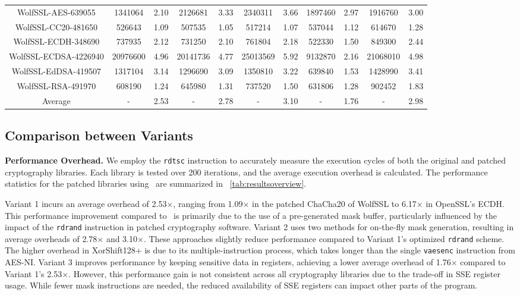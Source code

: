 \begin{table*}[!htbp]
\begin{tabular}{c|cc|cccc|cc|cc}
\hline
    WolfSSL-AES-639055	&1341064	&2.10 &	2126681	&3.33 	&2340311	&3.66 &	1897460	&2.97 & 1916760 & 3.00\\
    WolfSSL-CC20-481650	&526643	&1.09 &	507535	&1.05 	&517214	&1.07 &	537044	&1.12 & 614670 & 1.28\\
    WolfSSL-ECDH-348690	&737935	&2.12 &	731250	&2.10 	&761804	&2.18 &	522330	&1.50 & 849300 & 2.44\\
    WolfSSL-ECDSA-4226940	&20976600	&4.96 &	20141736	&4.77 	&25013569	&5.92 &	9132870	&2.16 & 21068010 & 4.98\\
    WolfSSL-EdDSA-419507	&1317104	&3.14 &	1296690	&3.09 	&1350810	&3.22 &	639840	&1.53 & 1428990 & 3.41\\
    WolfSSL-RSA-491970	&608190	&1.24 &	645980	&1.31 	&737520	&1.50 &	631806	&1.28 & 902452 & 1.83\\
\hline
    Average	&-	&2.53 &	-	&2.78 	&-	&3.10 &	-	&1.76 & - & 2.98\\
\hline
\end{tabular}
\end{table*}

\subsection{Comparison between Variants}
\label{subsec:variants}

\noindent \textbf{Performance Overhead.}
We employ the \texttt{rdtsc} instruction to accurately measure the execution cycles of both the original and patched cryptography libraries. 
Each library is tested over 200 iterations, and the average execution overhead is calculated. 
The performance statistics for the patched libraries using \tool\ are summarized in \T~\ref{tab:resultsoverview}.

Variant 1 incurs an average overhead of 2.53$\times$, ranging from 1.09$\times$ in the patched ChaCha20 of WolfSSL to 6.17$\times$ in OpenSSL's ECDH. 
This performance improvement compared to \ftool\ is primarily due to the use of a pre-generated mask buffer, particularly influenced by the impact of the \texttt{rdrand} instruction in patched cryptography software.
Variant 2 uses two methods for on-the-fly mask generation, resulting in average overheads of 2.78$\times$ and 3.10$\times$. 
These approaches slightly reduce performance compared to Variant 1's optimized \texttt{rdrand} scheme. 
The higher overhead in XorShift128+ is due to its multiple-instruction process, which takes longer than the single \texttt{vaesenc} instruction from AES-NI.
Variant 3 improves performance by keeping sensitive data in registers, achieving a lower average overhead of 1.76$\times$ compared to Variant 1's 2.53$\times$. 
However, this performance gain is not consistent across all cryptography libraries due to the trade-off in SSE register usage. While fewer mask instructions are needed, the reduced availability of SSE registers can impact other parts of the program.

